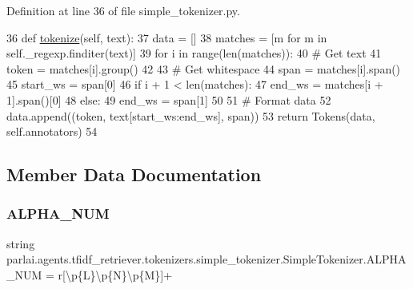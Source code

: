 Definition at line 36 of file simple\+\_\+tokenizer.\+py.


\begin{DoxyCode}
36     \textcolor{keyword}{def }\hyperlink{namespaceparlai_1_1agents_1_1tfidf__retriever_1_1build__tfidf_a1fdb457e98eb4e4c26047e229686a616}{tokenize}(self, text):
37         data = []
38         matches = [m \textcolor{keywordflow}{for} m \textcolor{keywordflow}{in} self.\_regexp.finditer(text)]
39         \textcolor{keywordflow}{for} i \textcolor{keywordflow}{in} range(len(matches)):
40             \textcolor{comment}{# Get text}
41             token = matches[i].group()
42 
43             \textcolor{comment}{# Get whitespace}
44             span = matches[i].span()
45             start\_ws = span[0]
46             \textcolor{keywordflow}{if} i + 1 < len(matches):
47                 end\_ws = matches[i + 1].span()[0]
48             \textcolor{keywordflow}{else}:
49                 end\_ws = span[1]
50 
51             \textcolor{comment}{# Format data}
52             data.append((token, text[start\_ws:end\_ws], span))
53         \textcolor{keywordflow}{return} Tokens(data, self.annotators)
54 \end{DoxyCode}


\subsection{Member Data Documentation}
\mbox{\label{classparlai_1_1agents_1_1tfidf__retriever_1_1tokenizers_1_1simple__tokenizer_1_1SimpleTokenizer_a05623c8143b625ce794a3575065a485f}} 
\subsubsection{\texorpdfstring{A\+L\+P\+H\+A\+\_\+\+N\+UM}{ALPHA\_NUM}}
{\footnotesize\ttfamily string parlai.\+agents.\+tfidf\+\_\+retriever.\+tokenizers.\+simple\+\_\+tokenizer.\+Simple\+Tokenizer.\+A\+L\+P\+H\+A\+\_\+\+N\+UM = r\textquotesingle{}\mbox{[}\textbackslash{}p\{L\}\textbackslash{}p\{N\}\textbackslash{}p\{M\}\mbox{]}+\textquotesingle{}\hspace{0.3cm}{\ttfamily [static]}}




